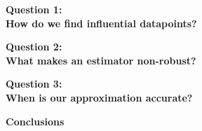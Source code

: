 \documentclass[10pt]{beamer}
\begin{document}


\begin{frame}{}

{\Large \textbf{Question 1:} \\ \vspace{0.5em}
\textbf{How do we find influential datapoints?}}

\end{frame}

% 

\begin{frame}{}

{\Large \textbf{Question 2:} \\ \vspace{0.5em}
\textbf{What makes an estimator non-robust?}}

\end{frame}

% 

\begin{frame}{}

{\Large \textbf{Question 3:} \\ \vspace{0.5em}
\textbf{When is our approximation accurate?}}

\end{frame}



\begin{frame}{}

{\Large \textbf{Conclusions} }

\end{frame}


\end{document}
